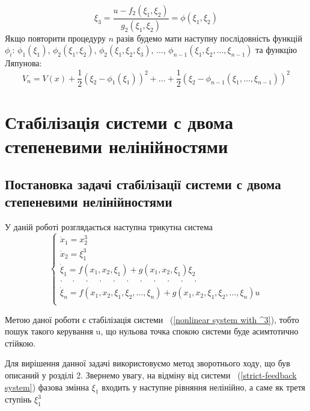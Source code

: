 \documentclass{article}
\begin{document}
\begin{equation}
    \xi_3 = \frac{u - f_2(\xi_1, \xi_2)}{g_2(\xi_1, \xi_2)} = \phi(\xi_1,\xi_2)
\end{equation}
Якщо повторити процедуру $n$ разів будемо мати наступну послідовність функцій $\phi_i$:
$\phi_1(\xi_1)$, $\phi_2(\xi_1,\xi_2)$, $\phi_2(\xi_1,\xi_2,\xi_3)$, $\dots$,
$\phi_{n-1}(\xi_1,\xi_2, \dots, \xi_{n-1})$
та функцію Ляпунова:
\begin{equation}
    V_n = V(x)+\frac{1}{2}(\xi_2-\phi_1(\xi_1))^2 + \dots 
    +\frac{1}{2}(\xi_2-\phi_{n-1}(\xi_1, \dots, \xi_{n-1}))^2
\end{equation}

\pagebreak
\section{Стабілізація системи с двома степеневими нелінійностями}
\subsection{Постановка задачі стабілізації системи с двома степеневими нелінійностями}
У даній роботі розглядається наступна трикутна система
\begin{equation}\label{nonlinear system with ^3}
    \begin{cases}
    \dot x_1 = x_2^3 \\
    \dot x_2 = \xi_1^3\\
    \dot \xi_1 = f(x_1, x_2,\xi_1) + g(x_1, x_2, \xi_1)\xi_2 \\
    \cdot \quad \cdot \quad \cdot \quad \cdot  \quad \cdot  \quad \cdot
    \quad \cdot  \quad \cdot  \quad \cdot  \quad \cdot  \quad \cdot\\
    \dot \xi_n = f(x_1, x_2,\xi_1,\xi_2, \dots, \xi_n) + 
    g(x_1, x_2, \xi_1,\xi_2, \dots, \xi_n)u \\
    \end{cases}
\end{equation}

Метою даної роботи є стабілізація системи ~(\ref{nonlinear system with ^3}), тобто пошук такого
керування u, що нульова точка спокою системи буде асимтотично стійкою. 

Для вирішення данної задачі
використовуємо метод зворотнього ходу, що був описаний у розділі 2. Звернемо увагу, на відміну від 
системи ~(\ref{strict-feedback system}) фазова змінна $\xi_1$ входить у наступне рівняння нелінійно,
а саме як третя ступінь $\xi_1^3$
\pagebreak
\end{document}
